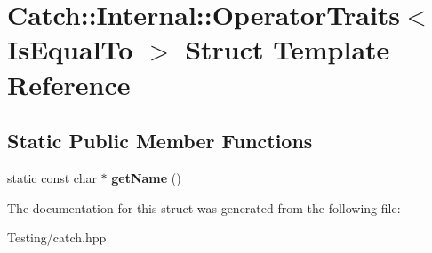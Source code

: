 \hypertarget{struct_catch_1_1_internal_1_1_operator_traits_3_01_is_equal_to_01_4}{\section{Catch\-:\-:Internal\-:\-:Operator\-Traits$<$ Is\-Equal\-To $>$ Struct Template Reference}
\label{struct_catch_1_1_internal_1_1_operator_traits_3_01_is_equal_to_01_4}
}
\subsection*{Static Public Member Functions}
\begin{DoxyCompactItemize}
\item 
\hypertarget{struct_catch_1_1_internal_1_1_operator_traits_3_01_is_equal_to_01_4_addf03ac66f0ed83abcc037a7a327d4f1}{static const char $\ast$ {\bfseries get\-Name} ()}\label{struct_catch_1_1_internal_1_1_operator_traits_3_01_is_equal_to_01_4_addf03ac66f0ed83abcc037a7a327d4f1}

\end{DoxyCompactItemize}


The documentation for this struct was generated from the following file\-:\begin{DoxyCompactItemize}
\item 
Testing/catch.\-hpp\end{DoxyCompactItemize}
